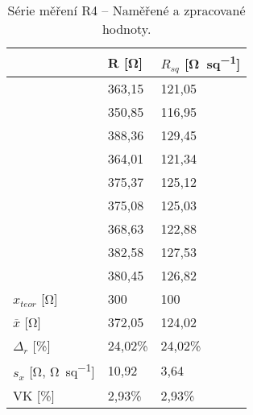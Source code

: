 \begin{table}[h!]
    \caption{Série měření R4 -- Naměřené a zpracované hodnoty.}
    \centering
    \def\arraystretch{1.4}
    \begin{tabular}{l|l|l}
                                                      & R [\unit{\ohm}]    & \(R_{sq}\) [\unit{\ohm\per sq}]  \\ \hline\hline
                                                      & 363,15 & 121,05 \\ \hline
                                                      & 350,85 & 116,95 \\ \hline
                                                      & 388,36 & 129,45 \\ \hline
                                                      & 364,01 & 121,34 \\ \hline
                                                      & 375,37 & 125,12 \\ \hline
                                                      & 375,08 & 125,03 \\ \hline
                                                      & 368,63 & 122,88 \\ \hline
                                                      & 382,58 & 127,53 \\ \hline
                                                      & 380,45 & 126,82 \\ \hline\hline
        \(x_{teor} \) [\unit{\ohm}]                   & 300    & 100    \\ \hline
        \(\overline{x} \) [\unit{\ohm}]               & 372,05 & 124,02 \\ \hline
        \(\Delta_{r} \) [\unit{\percent}]             & 24,02\%& 24,02\%\\ \hline\hline
        \(s_{x} \) [\unit{\ohm}, \unit{\ohm\per sq}]  & 10,92   & 3,64   \\ \hline
        VK [\unit{\percent}]                          & 2,93\% & 2,93\% \\ 
    \end{tabular}
    \label{tab:r4_hodnoty}
\end{table}

